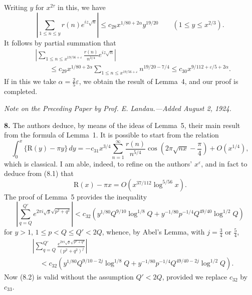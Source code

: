 \documentclass[11pt]{article}
\newcommand{\dd}{\,d}
\begin{document}
Writing $y$ for $x^{2\tau}$ in this, we have
\[
 \left|\sum_{1\leq n\leq y}r(n)e^{iz\sqrt n}\right|
 \leq c_{28}x^{1/80+2\alpha}y^{19/20}
 \qquad(1\leq y\leq x^{2/3}).
\]
It follows by partial summation that
\begin{align*}
&\left|\sum_{1\leq n\leq x^{19/56+\varepsilon}}
 \frac{r(n)}{n^{3/4}}e^{iz\sqrt n}\right| \\
&\qquad\leq c_{29}x^{1/80+2\alpha}
 \sum_{1\leq n\leq x^{19/56+\varepsilon}}n^{19/20-7/4}
 \leq c_{30}x^{9/112+\varepsilon/5+2\alpha}.
\end{align*}
If in this we take $\alpha=\frac25\varepsilon$, we obtain the result of
Lemma~4, and our proof is completed.

\bigskip
\begin{center}
\textit{Note on the Preceding Paper by Prof. E. Landau.---Added August 2,
1924.}
\end{center}

\noindent\textbf{8.}
The authors deduce, by means of the ideas of Lemma~5, their main result from
the formula of Lemma~1. It is possible to start from the relation
\begin{equation}
 \int_0^x\{\mathrm{R}(y)-\pi y\}\dd y
 =-c_{31}x^{3/4}\sum_{n=1}^{\infty}\frac{r(n)}{n^{5/4}}
 \cos\!\left(2\pi\sqrt{nx}-\frac\pi4\right)+O\!\left(x^{1/4}\right),
 \tag{8.1}
\end{equation}
which is classical. I am able, indeed, to refine on the authors'
$x^\varepsilon$, and in fact to deduce from (8.1) that
\[
 \mathrm{R}(x)-\pi x
 =O\!\left(x^{37/112}\log^{5/56}x\right).
\]
The proof of Lemma~5 provides the inequality
\[
 \left|\sum_{q=Q}^{Q'}e^{2\pi i\sqrt y\sqrt{p^2+q^2}}\right|
 <c_{32}\left(y^{1/80}Q^{9/10}\log^{1/8}Q
 +y^{-1/80}p^{-1/4}Q^{49/40}\log^{1/2}Q\right)
\]
for $y>1$, $1\leq p<Q\leq Q'<2Q$, whence, by Abel's Lemma, with
$j=\frac34$ or $\frac54$,
\begin{equation}
\begin{aligned}
&\left|\sum_{q=Q}^{Q'}
 \frac{e^{2\pi i\sqrt y\sqrt{p^2+q^2}}}{(p^2+q^2)^j}\right| \\
&\quad<c_{32}\left(y^{1/80}Q^{9/10-2j}\log^{1/8}Q
 +y^{-1/80}p^{-1/4}Q^{49/40-2j}\log^{1/2}Q\right).
\end{aligned}
\tag{8.2}
\end{equation}
Now (8.2) is valid without the assumption $Q'<2Q$, provided we replace
$c_{32}$ by $c_{33}$.
\end{document}
